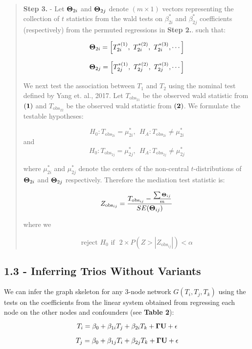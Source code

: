 \documentclass[12pt]{report}
\begin{document}
\begin{quote}
\textbf{Step 3.} - Let ${\bf \Theta}_{2i}$ and ${\bf \Theta}_{2j}$ denote $(m \times 1)$ vectors representing the collection of $t$ statistics from the wald tests on $\beta_{2i}^{\ast}$ and $\beta_{2j}^{\ast}$ coefficients (respectively) from the permuted regressions in \textbf{Step 2.}. such that:

\[ {\bf \Theta}_{2i} = \left[ T_{2i}^{\ast (1)}, \ T_{2i}^{\ast (2)}, \ T_{2i}^{\ast (3)}, \cdots \right] \]

\[ {\bf \Theta}_{2j} = \left[ T_{2j}^{\ast (1)}, \ T_{2j}^{\ast (2)}, \ T_{2j}^{\ast (3)}, \cdots \right]  \]

We next test the association between $T_1$ and $T_2$ using the nominal test defined by Yang et. al., 2017. Let $T_{\text{obs}_{21}}$ be the observed wald statistic from $\bf (1)$ and $T_{\text{obs}_{22}}$ be the observed wald statistic from $\bf(2)$. We formulate the testable hypotheses: 

\[ H_0: T_{\text{obs}_{2i}} = \mu_{2i}^{\ast}, \ \ H_A: T_{\text{obs}_{2i}} \neq \mu_{2i}^{\ast} \]
and
\[ H_0: T_{\text{obs}_{2j}} = \mu_{2j}^{\ast}, \ \ H_A: T_{\text{obs}_{2j}} \neq \mu_{2j}^{\ast} \]

where $\mu_{2i}^{\ast}$ and $\mu_{2j}^{\ast}$ denote the centers of the non-central $t$-distributions of ${\bf \Theta}_{2i}$ and ${\bf \Theta}_{2j}$ respectively. Therefore the mediation test statistic is:

\[ Z_{\text{obs}_{ij}} = \frac{T_{\text{obs}_{ij}} - \frac{\sum {\bf \Theta}_{ij}}{m} }{SE({\bf \Theta}_{ij})} \]

where we 

\[ \text{reject $H_0$ if} \ \ \ 2\times P(Z >  |Z_{\text{obs}_{ij}}|) < \alpha \]

\end{quote}

\subsection*{1.3 - Inferring Trios Without Variants} 
We can infer the graph skeleton for any 3-node network $G(T_i, T_j, T_k)$ using the tests on the coefficients from the linear system obtained from regressing each node on the other nodes and confounders (see \textbf{Table 2}):

\[ T_i = \beta_0 + \beta_{1i}T_j + \beta_{2i}T_k + {\bf \Gamma U} +\epsilon \]

\[ T_j = \beta_0 + \beta_{1j}T_i + \beta_{2j}T_k + {\bf \Gamma U} +\epsilon \]
\end{document}
